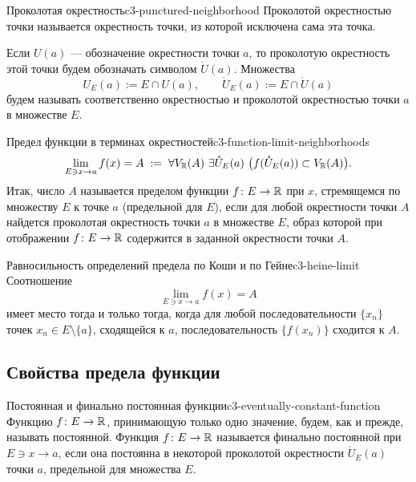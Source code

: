 \begin{definition}{Проколотая окрестность}{c3-punctured-neighborhood}
  Проколотой окрестностью точки называется окрестность точки, из которой
  исключена сама эта точка.

  Если $U(a)$ — обозначение окрестности точки $a$, то проколотую
  окрестность этой точки будем обозначать символом $\mathring U(a)$.
  Множества
  \[
    U_E(a):=E\cap U(a),
    \qquad
    \mathring U_E(a):=E\cap\mathring U(a)
  \]
  будем называть соответственно окрестностью и проколотой окрестностью
  точки $a$ в множестве $E$.
\end{definition}

\begin{definition}{Предел функции в терминах окрестностей}{c3-function-limit-neighborhoods}
  \[
    \lim_{E\ni x\to a}f(x)=A
    \;:=\;
    \forall V_{\mathbb{R}}(A)\ \exists\mathring U_E(a)\
    \bigl(f(\mathring U_E(a))\subset V_{\mathbb{R}}(A)\bigr).
  \]
  Итак, число $A$ называется пределом функции $f\colon E\to\mathbb{R}$ при $x$,
  стремящемся по множеству $E$ к точке $a$ (предельной для $E$), если для
  любой окрестности точки $A$ найдется проколотая окрестность точки $a$ в
  множестве $E$, образ которой при отображении $f\colon E\to\mathbb{R}$ содержится
  в заданной окрестности точки $A$.
\end{definition}

\begin{proposition}{Равносильность определений предела по Коши и по Гейне}{c3-heine-limit}
  Соотношение
  \[
    \lim_{E\ni x\to a}f(x)=A
  \]
  имеет место тогда и только тогда, когда для любой последовательности
  $\{x_n\}$ точек $x_n\in E\setminus\{a\}$, сходящейся к $a$,
  последовательность $\{f(x_n)\}$ сходится к $A$.
\end{proposition}

\subsection{Свойства предела функции}

\begin{definition}{Постоянная и финально постоянная функции}{c3-eventually-constant-function}
  Функцию $f\colon E\to\mathbb{R}$, принимающую только одно значение, будем, как и
  прежде, называть постоянной. Функция $f\colon E\to\mathbb{R}$ называется
  финально постоянной при $E\ni x\to a$, если она постоянна в некоторой
  проколотой окрестности $\mathring U_E(a)$ точки $a$, предельной для
  множества $E$.
\end{definition}

